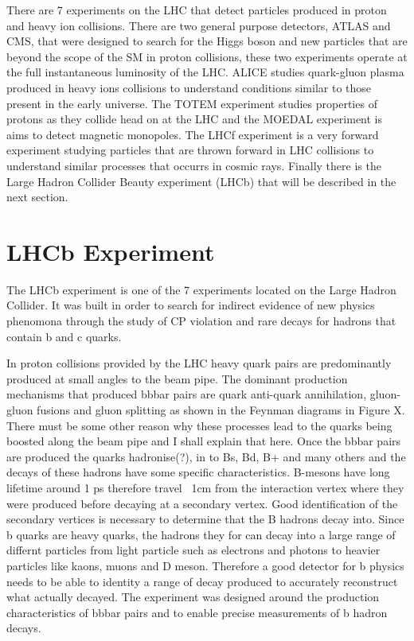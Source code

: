 There are 7 experiments on the LHC that detect particles produced in proton and heavy ion collisions. There are two general purpose detectors, ATLAS and CMS, that were designed to search for the Higgs boson and new particles that are beyond the scope of the SM in proton collisions, these two experiments operate at the full instantaneous luminosity of the LHC. %
ALICE studies quark-gluon plasma produced in heavy ions collisions to understand conditions similar to those present in the early universe. The TOTEM experiment studies properties of protons as they collide head on at the LHC and the MOEDAL experiment is aims to detect magnetic monopoles. The LHCf experiment is a very forward experiment studying particles that are thrown forward in LHC collisions to understand similar processes that occurrs in cosmic rays. Finally there is the Large Hadron Collider Beauty experiment (LHCb) that will be described in the next section. %




\section{LHCb Experiment}
\label{LHCb}
The LHCb experiment is one of the 7 experiments located on the Large Hadron Collider. It was built in order to search for indirect evidence of new physics phenomona through the study of CP violation and rare decays for hadrons that contain b and c quarks.

In proton collisions provided by the LHC heavy quark pairs are predominantly produced at small angles to the beam pipe. The dominant production mechanisms that produced bbbar pairs are quark anti-quark annihilation, gluon-gluon fusions and  gluon splitting as shown in the Feynman diagrams in Figure X. There must be some other reason why these processes lead to the quarks being boosted along the beam pipe and I shall explain that here. Once the bbbar pairs are produced the quarks hadronise(?), in to Bs, Bd, B+ and many others and the decays of these hadrons have some specific characteristics. B-mesons have long lifetime around 1 ps therefore travel ~1cm from the interaction vertex where they were produced before decaying at a secondary vertex. Good identification of the secondary vertices is necessary to determine that the B hadrons decay into. Since b quarks are heavy quarks, the hadrons they for can decay into a large range of differnt particles from light particle such as electrons and photons to heavier particles like kaons, muons and D meson. Therefore a good detector for b physics needs to be able to identity a range of decay produced to accurately reconstruct what actually decayed. The experiment was designed around the production characteristics of bbbar pairs and to enable precise measurements of b hadron decays. 


